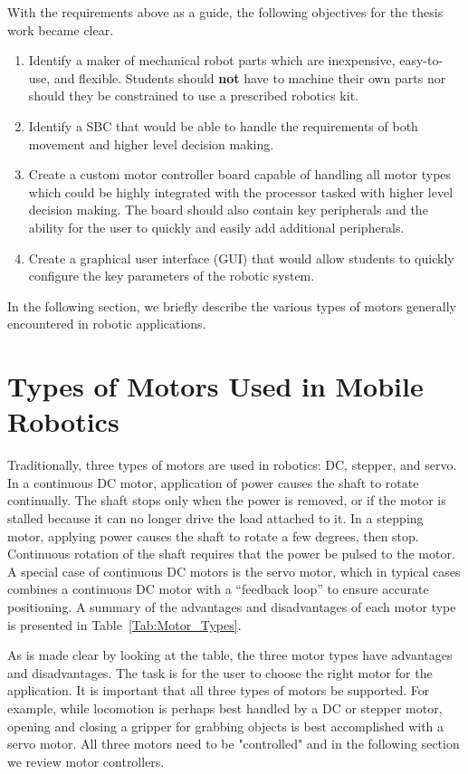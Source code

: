 \documentclass[12pt,oneside,final]{siuethesis}
\theoremstyle{definition}
\begin{document}
\noindent
With the requirements above as a guide, the following objectives for the thesis work became clear.
\begin{enumerate}
\item
Identify a maker of mechanical robot parts which are inexpensive, easy-to-use, and flexible. Students should \textbf{not} have to machine their own parts nor should they be constrained to use a prescribed robotics kit.
\item
Identify a SBC that would be able to handle the requirements of both movement and higher level decision making.
\item
Create a custom motor controller board capable of handling all motor types which could be highly integrated with the processor tasked with higher level decision making. The board should also contain key peripherals and the ability for the user to quickly and easily add additional peripherals.
\item
Create a graphical user interface (GUI) that would allow students to quickly configure the key parameters of the robotic system.
\end{enumerate}

\noindent
In the following section, we briefly describe the various types of motors generally encountered in robotic applications.

\section{Types of Motors Used in Mobile Robotics}


Traditionally, three types of motors are used in robotics: DC, stepper, and servo. In a continuous DC motor, application of power causes the shaft to rotate continually. The shaft stops only when the power is removed, or if the motor is stalled because it can no longer drive the load attached to it.  In a stepping motor, applying power causes the shaft to rotate a few degrees, then stop. Continuous rotation of the shaft requires that the power be pulsed to the motor.  A special case of continuous DC motors is the servo motor, which in typical cases combines a continuous DC motor with a “feedback loop” to ensure accurate positioning. A summary of the advantages and disadvantages of each motor type is presented in Table~\ref{Tab:Motor_Types}.  

As is made clear by looking at the table, the three motor types have advantages and disadvantages. The task is for the user to choose the right motor for the application. It is important that all three types of motors be supported. For example, while locomotion is perhaps best handled by a DC or stepper motor, opening and closing a gripper for grabbing objects is best accomplished with a servo motor. All three motors need to be "controlled" and in the following section we review motor controllers.
\end{document}
